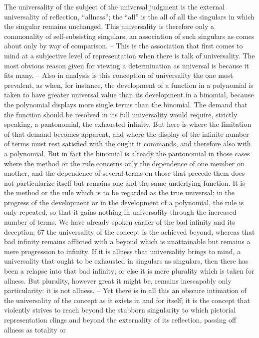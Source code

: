 The universality of the subject of the universal judgment is the external
universality of reflection, “allness”; the “all” is the all of all the singulars in
which the singular remains unchanged. This universality is therefore only
a commonality of self-subsisting singulars, an association of such singulars
as comes about only by way of comparison. – This is the association that
first comes to mind at a subjective level of representation when there is talk
of universality. The most obvious reason given for viewing a determination
as universal is because it fits many. – Also in analysis is this conception of
universality the one most prevalent, as when, for instance, the development
of a function in a polynomial is taken to have greater universal value than
its development in a binomial, because the polynomial displays more single
terms than the binomial. The demand that the function should be resolved
in its full universality would require, strictly speaking, a pantonomial, the
exhausted infinity. But here is where the limitation of that demand becomes
apparent, and where the display of the infinite number of terms must rest
satisfied with the ought it commands, and therefore also with a polynomial.
But in fact the binomial is already the pantonomial in those cases where
the method or the rule concerns only the dependence of one member on
another, and the dependence of several terms on those that precede them
does not particularize itself but remains one and the same underlying
function. It is the method or the rule which is to be regarded as the true
universal; in the progress of the development or in the development of a
polynomial, the rule is only repeated, so that it gains nothing in universality
through the increased number of terms. We have already spoken earlier of
the bad infinity and its deception; 67 the universality of the concept is the
achieved beyond, whereas that bad infinity remains afflicted with a beyond
which is unattainable but remains a mere progression to infinity. If it is allness
that universality brings to mind, a universality that ought to be exhausted
in singulars as singulars, then there has been a relapse into that bad infinity;
or else it is mere plurality which is taken for allness. But plurality, however
great it might be, remains inescapably only particularity: it is not allness. –
Yet there is in all this an obscure intimation of the universality of the concept
as it exists in and for itself; it is the concept that violently strives to reach
beyond the stubborn singularity to which pictorial representation clings
and beyond the externality of its reflection, passing off allness as totality or
